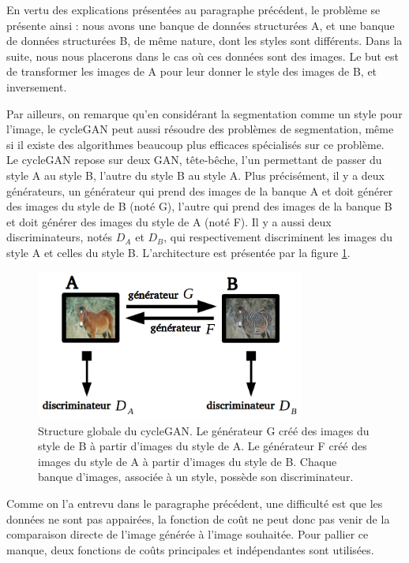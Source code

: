 En vertu des explications présentées au paragraphe précédent, le problème se présente ainsi : nous avons une banque de données structurées A, et une banque de données structurées B, de même nature, dont les styles sont différents. Dans la suite, nous nous placerons dans le cas où ces données sont des images. Le but est de transformer les images de A pour leur donner le style des images de B, et inversement.

Par ailleurs, on remarque qu'en considérant la segmentation comme un style pour l'image, le cycleGAN peut aussi résoudre des problèmes de segmentation, même si il existe des algorithmes beaucoup plus efficaces spécialisés sur ce problème.\\

Le cycleGAN repose sur deux GAN, tête-bêche, l'un permettant de passer du style A au style B, l'autre du style B au style A. Plus précisément, il y a deux générateurs, un générateur qui prend des images de la banque A et doit générer des images du style de B (noté G), l'autre qui prend des images de la banque B et doit générer des images du style de A (noté F). Il y a aussi deux discriminateurs, notés $D_A$ et $D_B$, qui respectivement discriminent les images du style A et celles du style B. L'architecture est présentée par la figure \ref{cycleDouble}.

\begin{figure}[!h]
\centering
\includegraphics[width=250pt]{"images/cycle/cycleDouble"}
\caption{Structure globale du cycleGAN. Le générateur G créé des images du style de B à partir d'images du style de A. Le générateur F créé des images du style de A à partir d'images du style de B. Chaque banque d'images, associée à un style, possède son discriminateur.}
\label{cycleDouble}
\end{figure}

Comme on l'a entrevu dans le paragraphe précédent, une difficulté est que les données ne sont pas appairées, la fonction de coût ne peut donc pas venir de la comparaison directe de l'image générée à l'image souhaitée. Pour pallier ce manque, deux fonctions de coûts principales et indépendantes sont utilisées.\\

